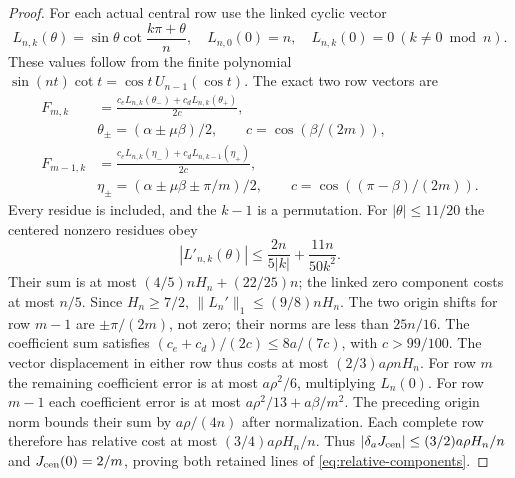 \begin{proof}
For each actual central row use the linked cyclic vector
\[
 L_{n,k}(\theta)=\sin\theta\cot\frac{k\pi+\theta}{n},\quad
 L_{n,0}(0)=n,\quad L_{n,k}(0)=0\ (k\ne0\bmod n).
\]
These values follow from the finite polynomial
$\sin(nt)\cot t=\cos t\,U_{n-1}(\cos t)$.
The exact two row vectors are
\begin{align*}
 F_{m,k}&=\frac{c_eL_{n,k}(\theta_-)+c_dL_{n,k}(\theta_+)}{2c},\\
 &\theta_\pm=(\alpha\pm\mu\beta)/2,\qquad c=\cos(\beta/(2m)),\\
 F_{m-1,k}&=\frac{c_eL_{n,k}(\eta_-)+c_dL_{n,k-1}(\eta_+)}{2c},\\
 &\eta_\pm=(\alpha\pm\mu\beta\pm\pi/m)/2,
 \qquad c=\cos((\pi-\beta)/(2m)).
\end{align*}
Every residue is included, and the $k-1$ is a permutation.
For $|\theta|\leq11/20$ the centered nonzero residues obey
\[
 |L'_{n,k}(\theta)|\leq\frac{2n}{5|k|}
                              +\frac{11n}{50k^2}.
\]
Their sum is at most $(4/5)nH_n+(22/25)n$; the linked zero
component costs at most $n/5$. Since $H_n\geq7/2$,
$\|L_n'\|_1\leq(9/8)nH_n$. The two origin shifts for row $m-1$
are $\pm\pi/(2m)$, not zero; their norms are less than $25n/16$.
The coefficient sum satisfies
$(c_e+c_d)/(2c)\leq8a/(7c)$, with $c>99/100$.
The vector displacement in either row thus costs at most
$(2/3)a\rho nH_n$. For row $m$ the remaining coefficient error
is at most $a\rho^2/6$, multiplying $L_n(0)$.
For row $m-1$ each coefficient error is at most
$a\rho^2/13+a\beta/m^2$. The preceding origin norm bounds their
sum by $a\rho/(4n)$ after normalization. Each complete row therefore
has relative cost at most $(3/4)a\rho H_n/n$.
Thus $|\delta_aJ_{\rm cen}|\leq(3/2)a\rho H_n/n$ and
$J_{\rm cen}(0)=2/m$, proving both retained lines of
\eqref{eq:relative-components}.


\end{proof}
